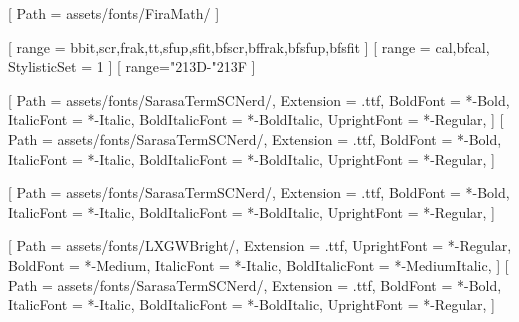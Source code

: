 

[
    Path = assets/fonts/FiraMath/
]


[ %
    range = {bbit,scr,frak,tt,sfup,sfit,bfscr,bffrak,bfsfup,bfsfit}
]
[ %
    range = {cal,bfcal},
    StylisticSet = 1
]
[ %
    range={"213D-"213F} %
]


\usepackage{fontspec}
\setmainfont{SarasaTermSCNerd}[ %
    Path = assets/fonts/SarasaTermSCNerd/,
    Extension = .ttf,
    BoldFont = *-Bold,
    ItalicFont = *-Italic,
    BoldItalicFont = *-BoldItalic,
    UprightFont = *-Regular,
]
\setsansfont{SarasaTermSCNerd}[
    Path = assets/fonts/SarasaTermSCNerd/,
    Extension = .ttf,
    BoldFont = *-Bold,
    ItalicFont = *-Italic,
    BoldItalicFont = *-BoldItalic,
    UprightFont = *-Regular,
]

\setmonofont{SarasaTermSCNerd}[
    Path = assets/fonts/SarasaTermSCNerd/,
    Extension = .ttf,
    BoldFont = *-Bold,
    ItalicFont = *-Italic,
    BoldItalicFont = *-BoldItalic,
    UprightFont = *-Regular,
]

\usepackage{xeCJK}
[
    Path = assets/fonts/LXGWBright/,
    Extension = .ttf,
    UprightFont = *-Regular,
    BoldFont = *-Medium,
    ItalicFont = *-Italic,
    BoldItalicFont = *-MediumItalic,
]
[
    Path = assets/fonts/SarasaTermSCNerd/,
    Extension = .ttf,
    BoldFont = *-Bold,
    ItalicFont = *-Italic,
    BoldItalicFont = *-BoldItalic,
    UprightFont = *-Regular,
]

